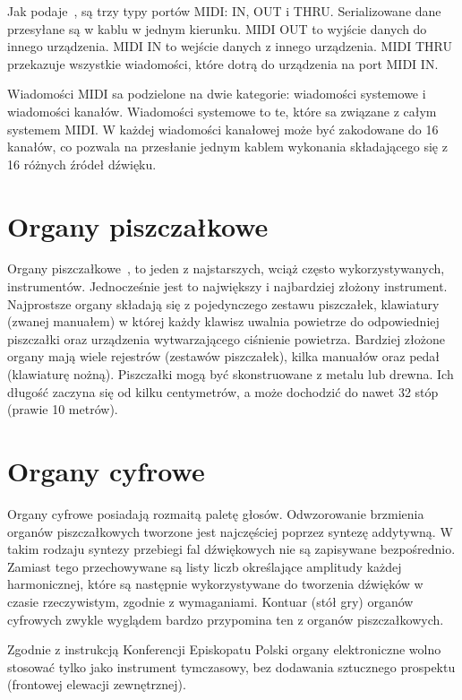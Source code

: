 \documentclass[11pt]{report}
\begin{document}
    Jak podaje~\cite{122929520160101}, są trzy typy portów MIDI: IN, OUT i THRU.
    Serializowane dane przesyłane są w kablu w jednym kierunku.
    MIDI OUT to wyjście danych do innego urządzenia.
    MIDI IN to wejście danych z innego urządzenia.
    MIDI THRU przekazuje wszystkie wiadomości, które dotrą do urządzenia na port MIDI IN.

    Wiadomości MIDI sa podzielone na dwie kategorie: wiadomości systemowe i wiadomości kanałów.
    Wiadomości systemowe to te, które sa związane z całym systemem MIDI.
    W każdej wiadomości kanałowej może być zakodowane do 16 kanałów, co pozwala na przesłanie jednym kablem wykonania składającego się z 16 różnych źródeł dźwięku.


    \section{Organy piszczałkowe}\label{sec:organy-piszczałkowe}
    Organy piszczałkowe~\cite{329316420170801}, to jeden z najstarszych, wciąż często wykorzystywanych, instrumentów.
    Jednocześnie jest to największy i najbardziej złożony instrument.
    Najprostsze organy składają się z pojedynczego zestawu piszczałek, klawiatury (zwanej manuałem) w której każdy klawisz uwalnia powietrze do odpowiedniej piszczałki oraz urządzenia wytwarzającego ciśnienie powietrza.
    Bardziej złożone organy mają wiele rejestrów (zestawów piszczałek), kilka manuałów oraz pedał (klawiaturę nożną).
    Piszczałki mogą być skonstruowane z metalu lub drewna.
    Ich długość zaczyna się od kilku centymetrów, a może dochodzić do nawet 32 stóp (prawie 10 metrów).


    \section{Organy cyfrowe}\label{sec:organy-cyfrowe}
    Organy cyfrowe posiadają rozmaitą paletę głosów.
    Odwzorowanie brzmienia organów piszczałkowych tworzone jest najczęściej poprzez syntezę addytywną.
    W takim rodzaju syntezy przebiegi fal dźwiękowych nie są zapisywane bezpośrednio.
    Zamiast tego przechowywane są listy liczb określające amplitudy każdej harmonicznej,
    które są następnie wykorzystywane do tworzenia dźwięków w czasie rzeczywistym, zgodnie z wymaganiami.
    Kontuar (stół gry) organów cyfrowych zwykle wyglądem bardzo przypomina ten z organów piszczałkowych.

    Zgodnie z instrukcją Konferencji Episkopatu Polski organy elektroniczne wolno stosować tylko jako instrument tymczasowy,
    bez dodawania sztucznego prospektu (frontowej elewacji zewnętrznej).
\end{document}
